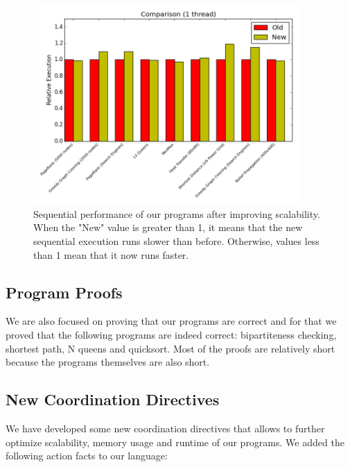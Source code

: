 \documentclass[10pt]{article}
\begin{document}
\begin{figure}[b]
\begin{center}
   \includegraphics[width=0.9\textwidth]{figures/comparison1}
\end{center}
\caption{Sequential performance of our programs after improving scalability.
   When the "New" value is greater than 1, it means that the new sequential
   execution runs slower than before. Otherwise, values less than 1 mean that it
   now runs faster.}
\label{fig:seq}
\end{figure}

\subsection{Program Proofs}

We are also focused on proving that our programs are correct and for that we
proved that the following programs are indeed correct: bipartiteness checking,
shortest path, N queens and quicksort. Most of the proofs are relatively
short because the programs themselves are also short.

\subsection{New Coordination Directives}

We have developed some new coordination directives that allows to further
optimize scalability, memory usage and runtime of our programs. We added the
following action facts to our language:
\end{document}
